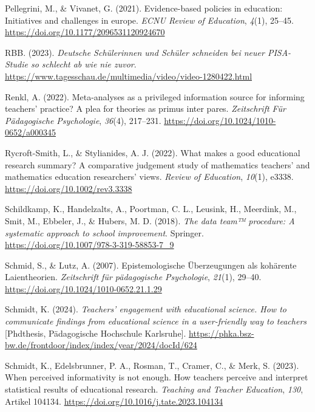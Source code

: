 \documentclass[
  man,
  floatsintext,
  longtable,
  nolmodern,
  notxfonts,
  notimes,
  colorlinks=true,linkcolor=blue,citecolor=blue,urlcolor=blue]{apa7}
\newlength{\cslhangindent}
\newenvironment{CSLReferences}[2] %
 {\begin{list}{}{%
  \setlength{\itemindent}{0pt}
  \setlength{\leftmargin}{0pt}
  \setlength{\parsep}{0pt}
  \ifodd #1
   \setlength{\leftmargin}{\cslhangindent}
   \setlength{\itemindent}{-1\cslhangindent}
  \fi
  \setlength{\itemsep}{#2\baselineskip}}}
 {\end{list}}
\begin{document}
\begin{CSLReferences}{1}{0}
Pellegrini, M., \& Vivanet, G. (2021). Evidence-based policies in
education: {Initiatives} and challenges in europe. \emph{ECNU Review of
Education}, \emph{4}(1), 25--45.
\url{https://doi.org/10.1177/2096531120924670}

RBB. (2023). \emph{Deutsche Schülerinnen und Schüler schneiden bei neuer
PISA-Studie so schlecht ab wie nie zuvor}.
\url{https://www.tagesschau.de/multimedia/video/video-1280422.html}

Renkl, A. (2022). Meta-analyses as a privileged information source for
informing teachers' practice? A plea for theories as primus inter pares.
\emph{Zeitschrift Für Pädagogische Psychologie}, \emph{36}(4), 217--231.
\url{https://doi.org/10.1024/1010-0652/a000345}

Rycroft-Smith, L., \& Stylianides, A. J. (2022). What makes a good
educational research summary? {A} comparative judgement study of
mathematics teachers' and mathematics education researchers' views.
\emph{Review of Education}, \emph{10}(1), e3338.
\url{https://doi.org/10.1002/rev3.3338}

Schildkamp, K., Handelzalts, A., Poortman, C. L., Leusink, H., Meerdink,
M., Smit, M., Ebbeler, J., \& Hubers, M. D. (2018). \emph{The data team™
procedure: {A} systematic approach to school improvement}. Springer.
\url{https://doi.org/10.1007/978-3-319-58853-7_9}

Schmid, S., \& Lutz, A. (2007). Epistemologische Überzeugungen als
kohärente Laientheorien. \emph{Zeitschrift für pädagogische
Psychologie}, \emph{21}(1), 29--40.
\url{https://doi.org/10.1024/1010-0652.21.1.29}

Schmidt, K. (2024). \emph{Teachers' engagement with educational science.
{How} to communicate findings from educational science in a
user-friendly way to teachers} {[}Phdthesis, Pädagogische Hochschule
Karlsruhe{]}.
\url{https://phka.bsz-bw.de/frontdoor/index/index/year/2024/docId/624}

Schmidt, K., Edelsbrunner, P. A., Rosman, T., Cramer, C., \& Merk, S.
(2023). When perceived informativity is not enough. How teachers
perceive and interpret statistical results of educational research.
\emph{Teaching and Teacher Education}, \emph{130}, Artikel 104134.
\url{https://doi.org/10.1016/j.tate.2023.104134}


\end{CSLReferences}
\end{document}
